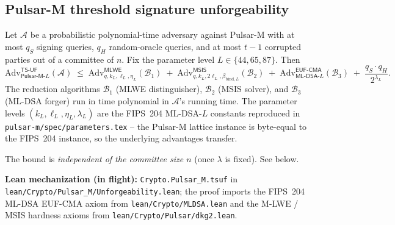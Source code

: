 
\subsection*{Pulsar-M threshold signature unforgeability}

\begin{theorem}
\label{thm:pulsar-m-tsuf}
Let $\mathcal{A}$ be a probabilistic polynomial-time adversary against
Pulsar-M with at most $q_S$ signing queries, $q_H$ random-oracle
queries, and at most $t-1$ corrupted parties out of a committee of
$n$. Fix the parameter level $L \in \{44, 65, 87\}$. Then
\[
  \mathrm{Adv}^{\mathsf{TS\text{-}UF}}_{\mathsf{Pulsar\text{-}M}\text{-}L}(\mathcal{A})
  \;\leq\;
  \mathrm{Adv}^{\mathsf{MLWE}}_{q, k_L, \ell_L, \eta_L}(\mathcal{B}_1)
  \;+\;
  \mathrm{Adv}^{\mathsf{MSIS}}_{q, k_L, 2\ell_L, \beta_{\mathrm{bind}, L}}(\mathcal{B}_2)
  \;+\;
  \mathrm{Adv}^{\mathsf{EUF\text{-}CMA}}_{\mathsf{ML\text{-}DSA}\text{-}L}(\mathcal{B}_3)
  \;+\;
  \frac{q_S \cdot q_H}{2^{\lambda_L}}.
\]
The reduction algorithms $\mathcal{B}_1$ (MLWE distinguisher),
$\mathcal{B}_2$ (MSIS solver), and $\mathcal{B}_3$ (ML-DSA forger)
run in time polynomial in $\mathcal{A}$'s running time. The parameter
levels $(k_L, \ell_L, \eta_L, \lambda_L)$ are the FIPS~204 ML-DSA-$L$
constants reproduced in \texttt{pulsar-m/spec/parameters.tex} -- the
Pulsar-M lattice instance is byte-equal to the FIPS~204 instance, so
the underlying advantages transfer.

The bound is \emph{independent of the committee size $n$} (once
$\lambda$ is fixed). See  below.
\end{theorem}

\textbf{Lean mechanization (in flight):}
\texttt{Crypto.Pulsar\_M.tsuf} in
\texttt{lean/Crypto/Pulsar\_M/Unforgeability.lean}; the proof
imports the FIPS~204 ML-DSA EUF-CMA axiom from
\texttt{lean/Crypto/MLDSA.lean} and the M-LWE / MSIS hardness axioms
from \texttt{lean/Crypto/Pulsar/dkg2.lean}.

